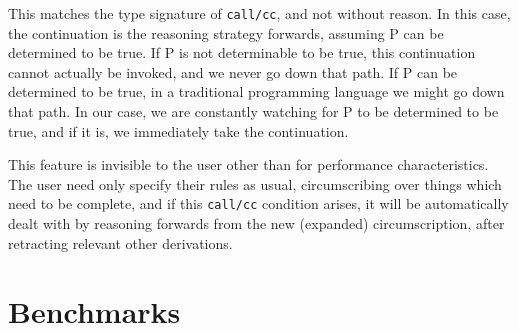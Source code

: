 This matches the type signature of \texttt{call/cc}, and not without reason.
In this case, the continuation is the reasoning strategy forwards, assuming P can be determined to be true.
If P is not determinable to be true, this continuation cannot actually be invoked, and we never go down that path.
If P can be determined to be true, in a traditional programming language we might go down that path.
In our case, we are constantly watching for P to be determined to be true, and if it is, we immediately take the continuation.

This feature is invisible to the user other than for performance characteristics.
The user need only specify their rules as usual, circumscribing over things which need to be complete, and if this \texttt{call/cc} condition arises, it will be automatically dealt with by reasoning forwards from the new (expanded) circumscription, after retracting relevant other derivations.




\section{Benchmarks}
